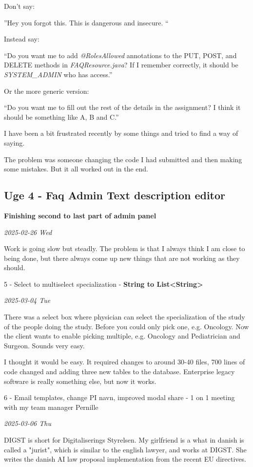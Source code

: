 \documentclass[../main.tex]{subfiles}
\begin{document}
Don't say:

''Hey you forgot this. This is dangerous and insecure. ``

Instead say:

``Do you want me to add \emph{@RolesAllowed} annotations to the PUT, POST, and DELETE methods in \emph{FAQResource.java}? If I remember correctly, it should be \emph{SYSTEM\_ADMIN} who has access.''

Or the more generic version:

``Do you want me to fill out the rest of the details in the assignment? I think it should be something like A, B and C.''

I have been a bit frustrated recently by some things and tried to find a way of saying.

The problem was someone changing the code I had submitted and then making some mistakes. But it all worked out in the end. 

\subsection{Uge 4 - Faq Admin Text description editor} \textbf{Finishing second to last part of admin panel}

\textit{2025-02-26 Wed}

Work is going slow but steadly. The problem is that I always think I am
close to being done, but there always come up new things that are not
working as they should. 

5 - Select to multiselect specialization - \textbf{String to
List\textless String\textgreater{}}

\textit{2025-03-04 Tue}

There was a select box where physician can select the specialization of the study of the people doing the study. Before you could only pick one, e.g. Oncology. Now the client wants to enable picking multiple, e.g. Oncology and Pediatrician and Surgeon. Sounds very easy.

I thought it would be easy. It required changes to around 30-40 files, 700 lines of code changed and adding three new tables to the database. Enterprise legacy software is really something else, but now it
works. 

6 - Email templates, change PI navn, improved modal share - 1 on 1
meeting with my team manager Pernille

\textit{2025-03-06 Thu}

DIGST is short for Digitaliserings Styrelsen. My girlfriend is a what in danish is called a "jurist", which is similar to the english lawyer, and works at DIGST. She writes the danish AI law proposal implementation from the recent EU directives.
\end{document}
